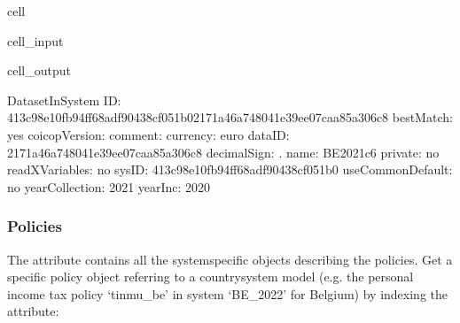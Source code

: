 \documentclass[letterpaper,10pt,english]{sphinxmanual}
\begin{document}
\begin{sphinxuseclass}{cell}
\begin{sphinxuseclass}{cell_input}
\begin{sphinxVerbatim}[commandchars=\\\{\}]
\PYG{p}{[}\PYG{p}{]}\PYG{p}{[}\PYG{p}{]}\PYG{p}{[}\PYG{p}{]}
\end{sphinxVerbatim}

\end{sphinxuseclass}
\begin{sphinxuseclass}{cell_output}
\begin{sphinxVerbatim}[commandchars=\\\{\}]
\PYGZhy{}\PYGZhy{}\PYGZhy{}\PYGZhy{}\PYGZhy{}\PYGZhy{}\PYGZhy{}\PYGZhy{}\PYGZhy{}\PYGZhy{}\PYGZhy{}\PYGZhy{}\PYGZhy{}\PYGZhy{}\PYGZhy{}\PYGZhy{}\PYGZhy{}\PYGZhy{}\PYGZhy{}\PYGZhy{}\PYGZhy{}\PYGZhy{}\PYGZhy{}\PYGZhy{}\PYGZhy{}\PYGZhy{}\PYGZhy{}\PYGZhy{}\PYGZhy{}\PYGZhy{}
DatasetInSystem
\PYGZhy{}\PYGZhy{}\PYGZhy{}\PYGZhy{}\PYGZhy{}\PYGZhy{}\PYGZhy{}\PYGZhy{}\PYGZhy{}\PYGZhy{}\PYGZhy{}\PYGZhy{}\PYGZhy{}\PYGZhy{}\PYGZhy{}\PYGZhy{}\PYGZhy{}\PYGZhy{}\PYGZhy{}\PYGZhy{}\PYGZhy{}\PYGZhy{}\PYGZhy{}\PYGZhy{}\PYGZhy{}\PYGZhy{}\PYGZhy{}\PYGZhy{}\PYGZhy{}\PYGZhy{}
	 ID: \PYGZsq{}413c98e1\PYGZhy{}0fb9\PYGZhy{}4ff6\PYGZhy{}8adf\PYGZhy{}90438cf051b02171a46a\PYGZhy{}7480\PYGZhy{}41e3\PYGZhy{}9ee0\PYGZhy{}7caa85a306c8\PYGZsq{}
	 bestMatch: \PYGZsq{}yes\PYGZsq{}
	 coicopVersion: \PYGZsq{}\PYGZsq{}
	 comment: \PYGZsq{}\PYGZsq{}
	 currency: \PYGZsq{}euro\PYGZsq{}
	 dataID: \PYGZsq{}2171a46a\PYGZhy{}7480\PYGZhy{}41e3\PYGZhy{}9ee0\PYGZhy{}7caa85a306c8\PYGZsq{}
	 decimalSign: \PYGZsq{}.\PYGZsq{}
	 name: \PYGZsq{}BE\PYGZus{}2021\PYGZus{}c6\PYGZsq{}
	 private: \PYGZsq{}no\PYGZsq{}
	 readXVariables: \PYGZsq{}no\PYGZsq{}
	 sysID: \PYGZsq{}413c98e1\PYGZhy{}0fb9\PYGZhy{}4ff6\PYGZhy{}8adf\PYGZhy{}90438cf051b0\PYGZsq{}
	 useCommonDefault: \PYGZsq{}no\PYGZsq{}
	 yearCollection: \PYGZsq{}2021\PYGZsq{}
	 yearInc: \PYGZsq{}2020\PYGZsq{}
\end{sphinxVerbatim}

\end{sphinxuseclass}
\end{sphinxuseclass}

\subsubsection{Policies}
\label{\detokenize{userguide:id3}}
\sphinxAtStartPar
The attribute  contains all the system\sphinxhyphen{}specific  objects describing the policies.
Get a specific policy object referring to a country\sphinxhyphen{}system model (e.g. the personal income tax policy ‘tinmu\_be’ in system ‘BE\_2022’ for Belgium) by indexing the  attribute:
\end{document}
